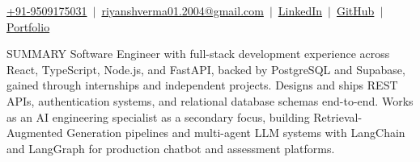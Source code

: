 \documentclass{resume} %
\begin{document}

\vspace{-22pt}

\begin{center}
    {\normalsize
    \href{tel:+919509175031}{+91-9509175031}
    \,${\vert}$\,
    \href{mailto:riyanshverma01.2004@gmail.com}{riyanshverma01.2004@gmail.com}
    \,${\vert}$\,
    \href{https://www.linkedin.com/in/riyansh-verma}{LinkedIn}
    \,${\vert}$\,
    \href{https://github.com/Riyanshverma}{GitHub}
    \,${\vert}$\,
    \href{https://riyansh-portfolio-five.vercel.app/}{Portfolio}
    }
    \\[2pt]
\end{center}

\vspace{-2pt}


\begin{rSection}{SUMMARY}
Software Engineer with full-stack development experience across React, TypeScript, Node.js, and FastAPI, backed by PostgreSQL and Supabase, gained through internships and independent projects. Designs and ships REST APIs, authentication systems, and relational database schemas end-to-end. Works as an AI engineering specialist as a secondary focus, building Retrieval-Augmented Generation pipelines and multi-agent LLM systems with LangChain and LangGraph for production chatbot and assessment platforms.

\end{rSection}

\vspace{-2pt}

\end{document}
